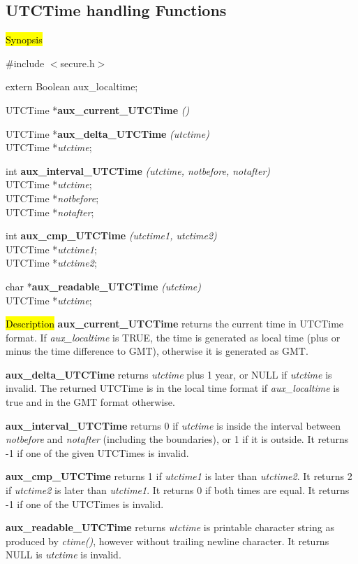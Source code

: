 \subsection{UTCTime handling Functions}
\label{aux_time}
\hl{Synopsis}

\#include $<$secure.h$>$

extern Boolean aux\_localtime;

UTCTime *{\bf aux\_current\_UTCTime} {\em ()}

UTCTime *{\bf aux\_delta\_UTCTime} {\em (utctime)} \\
UTCTime *{\em utctime}; 

int {\bf aux\_interval\_UTCTime} {\em (utctime, notbefore, notafter)} \\
UTCTime *{\em utctime}; \\ 
UTCTime *{\em notbefore}; \\ 
UTCTime *{\em notafter};

int {\bf aux\_cmp\_UTCTime} {\em (utctime1, utctime2)} \\
UTCTime *{\em utctime1}; \\
UTCTime *{\em utctime2}; 

char *{\bf aux\_readable\_UTCTime} {\em (utctime)} \\
UTCTime *{\em utctime}; 

\hl{Description}
{\bf aux\_current\_UTCTime} returns the current time in UTCTime format. If
{\em aux\_localtime} is TRUE, the time is generated as local time (plus
or minus the time difference to GMT), otherwise it is generated as GMT.

{\bf aux\_delta\_UTCTime} returns {\em utctime} plus 1 year, or NULL if
{\em utctime} is invalid. The returned UTCTime is in the local time format
if {\em aux\_localtime} is true and in the GMT format otherwise. 

{\bf aux\_interval\_UTCTime} returns 0 if {\em utctime} is inside the interval
between {\em notbefore} and {\em notafter} (including the boundaries), or 1 if
it is outside. It returns -1 if one of the given UTCTimes is invalid.

{\bf aux\_cmp\_UTCTime} returns 1 if {\em utctime1} is later than {\em utctime2}.
It returns 2 if {\em utctime2} is later than {\em utctime1}. It returns 0
if both times are equal. It returns -1 if one of the UTCTimes is invalid.

{\bf aux\_readable\_UTCTime} returns {\em utctime} is printable character string
as produced by {\em ctime()}, however without trailing newline character. It
returns NULL is {\em utctime} is invalid.

